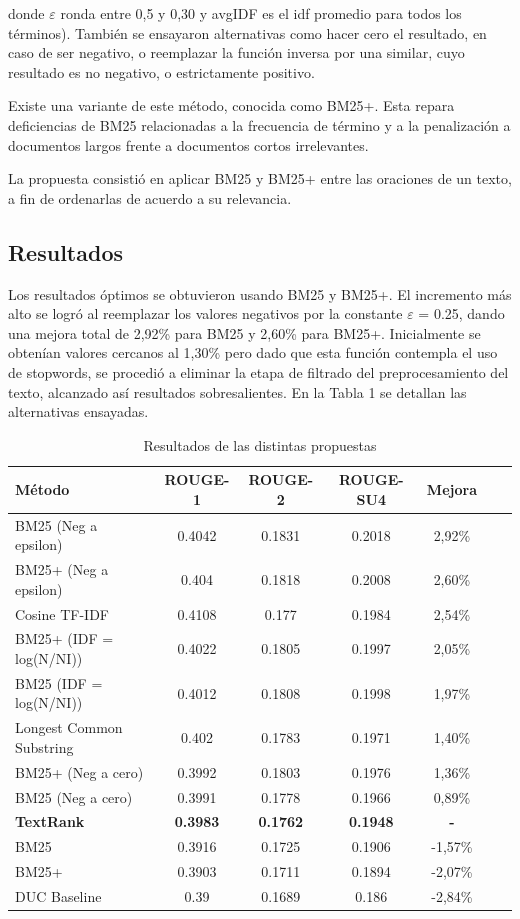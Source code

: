 \documentclass[a4paper]{article}
\begin{document}
donde $\varepsilon$ ronda entre 0,5 y 0,30 y avgIDF es el idf promedio para todos los términos).
También se ensayaron alternativas como hacer cero el resultado, en caso de ser negativo, o reemplazar la función inversa por una similar, cuyo resultado es no negativo, o estrictamente positivo. 

Existe una variante de este método, conocida como BM25+. Esta repara deficiencias de BM25 relacionadas a la frecuencia de término y a la penalización a documentos largos frente a documentos cortos irrelevantes.

La propuesta consistió en aplicar BM25 y BM25+ entre las oraciones de un texto, a fin de ordenarlas de acuerdo a su relevancia.


\subsection{Resultados}
Los resultados óptimos se obtuvieron usando BM25 y BM25+. El incremento más alto se logró al reemplazar los valores negativos por la constante $\varepsilon$ = 0.25, dando una mejora total de 2,92\% para BM25 y 2,60\% para BM25+. Inicialmente se obtenían valores cercanos al 1,30\% pero dado que esta función contempla el uso de stopwords, se procedió a eliminar la etapa de filtrado del preprocesamiento del texto, alcanzado así resultados sobresalientes. En la Tabla 1 se detallan las alternativas ensayadas.

\begin{table}
\caption{Resultados de las distintas propuestas}
\begin{center}
\begin{tabular}{l*{5}{c}r}
\hline
\rule{0pt}{12pt}
Método & ROUGE-1 & ROUGE-2 & ROUGE-SU4 & Mejora \\[2pt]
\hline\rule{0pt}{12pt}
BM25 (Neg a epsilon) & 0.4042 & 0.1831 & 0.2018 & 2,92\% \\
BM25+ (Neg a epsilon) & 0.404 & 0.1818 & 0.2008 & 2,60\% \\
Cosine TF-IDF & 0.4108 & 0.177 & 0.1984 & 2,54\% \\
BM25+ (IDF = log(N/NI)) & 0.4022 & 0.1805 & 0.1997 & 2,05\% \\ 
BM25 (IDF = log(N/NI)) & 0.4012 & 0.1808 & 0.1998 & 1,97\% \\ 
Longest Common Substring & 0.402 & 0.1783 & 0.1971 & 1,40\% \\
BM25+ (Neg a cero) & 0.3992 & 0.1803 & 0.1976 & 1,36\% \\ 
BM25 (Neg a cero) & 0.3991 & 0.1778 & 0.1966 & 0,89\% \\
\textbf{TextRank} & \textbf{0.3983} & \textbf{0.1762} & \textbf{0.1948} & \textbf{-}\\
BM25 & 0.3916 & 0.1725 & 0.1906 & -1,57\% \\
BM25+ & 0.3903 & 0.1711 & 0.1894 & -2,07\% \\
DUC Baseline & 0.39 & 0.1689 & 0.186 & -2,84\% \\ [2pt]
\hline
\end{tabular}
\end{center}
\end{table}
\end{document}
